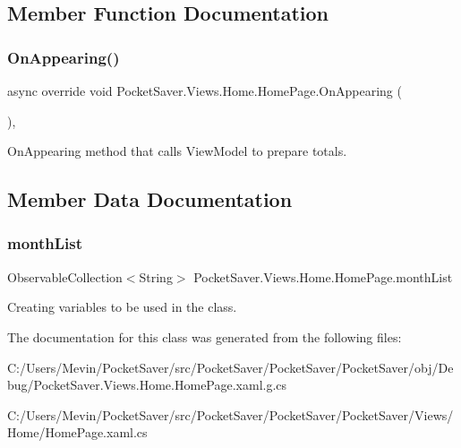 \subsection{Member Function Documentation}
\mbox{\label{class_pocket_saver_1_1_views_1_1_home_1_1_home_page_a47aecb7aa46d3e9e22867599a254b478}} 
\subsubsection{\texorpdfstring{On\+Appearing()}{OnAppearing()}}
{\footnotesize\ttfamily async override void Pocket\+Saver.\+Views.\+Home.\+Home\+Page.\+On\+Appearing (\begin{DoxyParamCaption}{ }\end{DoxyParamCaption})\hspace{0.3cm}{\ttfamily [inline]}, {\ttfamily [protected]}}



On\+Appearing method that calls View\+Model to prepare totals. 



\subsection{Member Data Documentation}
\mbox{\label{class_pocket_saver_1_1_views_1_1_home_1_1_home_page_a3304f2eabf76bd2855aa806363a9616d}} 
\subsubsection{\texorpdfstring{month\+List}{monthList}}
{\footnotesize\ttfamily Observable\+Collection$<$String$>$ Pocket\+Saver.\+Views.\+Home.\+Home\+Page.\+month\+List\hspace{0.3cm}{\ttfamily [static]}}



Creating variables to be used in the class. 



The documentation for this class was generated from the following files\+:\begin{DoxyCompactItemize}
\item 
C\+:/\+Users/\+Mevin/\+Pocket\+Saver/src/\+Pocket\+Saver/\+Pocket\+Saver/\+Pocket\+Saver/obj/\+Debug/Pocket\+Saver.\+Views.\+Home.\+Home\+Page.\+xaml.\+g.\+cs\item 
C\+:/\+Users/\+Mevin/\+Pocket\+Saver/src/\+Pocket\+Saver/\+Pocket\+Saver/\+Pocket\+Saver/\+Views/\+Home/Home\+Page.\+xaml.\+cs\end{DoxyCompactItemize}
